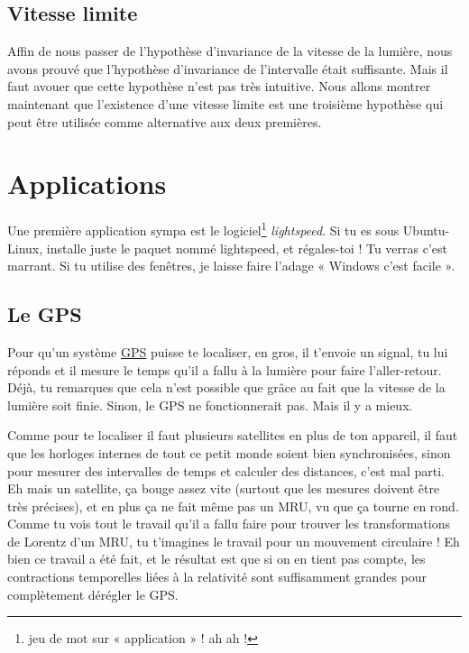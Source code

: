 					\subsection{Vitesse limite}

Affin de nous passer de l'hypothèse d'invariance de la vitesse de la lumière, nous avons prouvé que l'hypothèse d'invariance de l'intervalle était suffisante. Mais il faut avouer que cette hypothèse n'est pas très intuitive. Nous allons montrer maintenant que l'existence d'une vitesse limite est une troisième hypothèse qui peut être utilisée comme alternative aux deux premières.

\section{Applications}

Une première application sympa est le logiciel\footnote{jeu de mot sur « application » ! ah ah !} \emph{lightspeed}. Si tu es sous Ubuntu-Linux, installe juste le paquet nommé lightspeed, et régales-toi ! Tu verras c'est marrant. Si tu utilise des fenêtres, je laisse faire l'adage « Windows c'est facile ».

\subsection{Le GPS}

Pour qu'un système \href{http://fr.wikipedia.org/wiki/Global\_Positioning\_System}{GPS} puisse te localiser, en gros, il t'envoie un signal, tu lui réponds et il mesure le temps qu'il a fallu à la lumière pour faire l'aller-retour. Déjà, tu remarques que cela n'est possible que grâce au fait que la vitesse de la lumière soit finie. Sinon, le GPS ne fonctionnerait pas. Mais il y a mieux.

Comme pour te localiser il faut plusieurs satellites en plus de ton appareil, il faut que les horloges internes de tout ce petit monde soient bien synchronisées, sinon pour mesurer des intervalles de temps et calculer des distances, c'est mal parti. Eh mais un satellite, ça bouge assez vite (surtout que les mesures doivent être très précises), et en plus ça ne fait même pas un MRU, vu que ça tourne en rond. Comme tu vois tout le travail qu'il a fallu faire pour trouver les transformations de Lorentz d'un MRU, tu t'imagines le travail pour un mouvement circulaire ! Eh bien ce travail a été fait, et le résultat est que si on en tient pas compte, les contractions temporelles liées à la relativité sont suffisamment grandes pour complètement dérégler le GPS.


